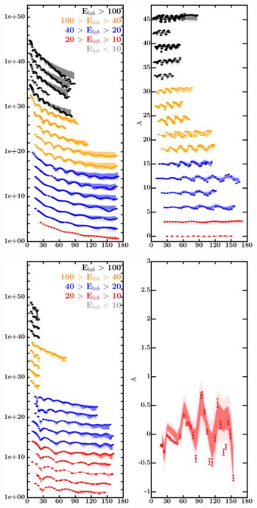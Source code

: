 \documentclass[twocolumn,secnumarabic,amssymb, nobibnotes, aps, prl,
superscriptaddress, nobalancelastpage]{revtex4}
\begin{document}
\begin{figure}[!htb]
    \centering
    \begin{minipage}{0.4\linewidth}
        \centering
        \includegraphics[width=\linewidth]{figures/pb208_protonElastic.png}
        \label{DOM_pb208_proton_elastic}
    \end{minipage}\hspace{6pt}
    \begin{minipage}{0.4\linewidth}
        \centering
        \includegraphics[width=\linewidth]{figures/pb208_neutronElastic.png}

\end{minipage}
\end{figure}
\end{document}

